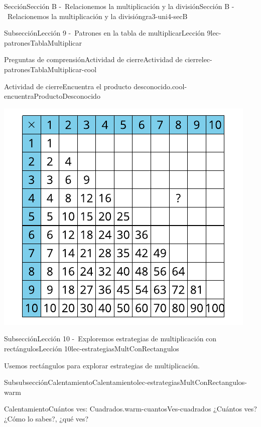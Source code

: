 \documentclass[twoside,10pt,]{article}
\begin{document}
\begin{sectionptx}{Sección}{Sección B -~Relacionemos la multiplicación y la división}{}{Sección B -~Relacionemos la multiplicación y la división}{}{}{gra3-uni4-secB}
\begin{subsectionptx}{Subsección}{Lección 9 -~Patrones en la tabla de multiplicar}{}{Lección 9}{}{}{lec-patronesTablaMultiplicar}
\begin{reading-questions-subsubsection}{Preguntas de comprensión}{Actividad de cierre}{}{Actividad de cierre}{}{}{lec-patronesTablaMultiplicar-cool}
\begin{project}{Actividad de cierre}{Encuentra el producto desconocido.}{cool-encuentraProductoDesconocido}
\begin{image}{0}{1}{0}{}
\includegraphics[width=\linewidth]{external/svg-source/tikz-file-153040-scale13.pdf}
\end{image}%
\end{project}%
\end{reading-questions-subsubsection}
\end{subsectionptx}
%
%
\typeout{************************************************}
\typeout{************************************************}
%
\begin{subsectionptx}{Subsección}{Lección 10 -~Exploremos estrategias de multiplicación con rectángulos}{}{Lección 10}{}{}{lec-estrategiasMultConRectangulos}
\begin{introduction}{}%
Usemos rectángulos para explorar estrategias de multiplicación.%
\end{introduction}%
%
%
\typeout{************************************************}
\typeout{************************************************}
%
\begin{subsubsectionptx}{Subsubsección}{Calentamiento}{}{Calentamiento}{}{}{lec-estrategiasMultConRectangulos-warm}
\begin{exploration}{Calentamiento}{Cuántos ves: Cuadrados.}{warm-cuantosVes-cuadrados}%
¿Cuántos ves?\\
 ¿Cómo lo sabes?, ¿qué ves?%
\begin{sidebyside}{3}{0}{0}{0.05}%

\end{sidebyside}
\end{exploration}
\end{subsubsectionptx}
\end{subsectionptx}
\end{sectionptx}
\end{document}
